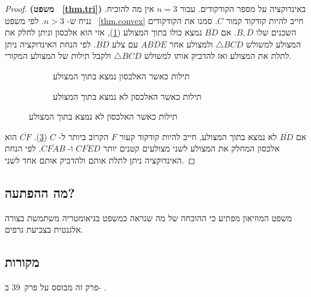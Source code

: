\begin{proof}\textbf{%
(משפט%
~\ref{thm.tri})}
באינדוקציה על מספר הקודקודים. עבור
$n=3$
אין מה להוכיח. נניח ש-%
$n>3$.
לפי משפט%
~\ref{thm.convex}
חייב להיות קודקוד קמור
$C$.
סמנו את הקודקודים השכנים שלו
$B,D$.
אם
$\overline{BD}$
נמצא כולו בתוך המצולע 
(\ref{f.contained}),
אזי הוא אלכסון וניתן לחלק את המצולע למשולש 
$\triangle BCD$
ולמצולע אחר
$\overline{ABDE}$
עם צלע
$\overline{BD}$.
לפי הנחת האינדוקציה ניתן לתלת את המצולע ואז להדביק אותו למשולש
$\triangle BCD$
ולקבל תילות של המצולע המקורי.
\begin{figure}[tb]
\begin{center}
\begin{subfigure}{.4\textwidth}
\caption{תילות כאשר האלכסון נמצא בתוך המצולע}\label{f.contained}
\end{subfigure}
\hspace{3em}
\begin{subfigure}{.4\textwidth}
\caption{תילות כאשר האלכסון לא נמצא בתוך המצולע}\label{f.museum.concave-vertices}
\end{subfigure}
\end{center}
\end{figure}

אם 
$\overline{BD}$
לא נמצא בתוך המצולע, חייב להיות קודקוד קעור
$F$
הקרוב ביותר ל-%
$C$
(\ref{f.museum.concave-vertices}).
$\overline{CF}$
הוא אלכסון המחלק את המצולע לשני מצולעים קטנים יותר
$\overline{CFED}$
ו-%
$\overline{CFAB}$.
לפי הנחת האינדוקציה ניתן לתלת אותם ולהדביק אותם אחד לשני.
\end{proof}


\subsection*{מה ההפתעה?}
משפט המוזיאון מפתיע כי ההוכחה של מה שנראה כמשפט בגיאומטריה משתמשת בצורה אלגנטית בצביעת גרפים.

\subsection*{מקורות}

פרק זה מבוסס על פרק~$39$ ב-%
\cite{thebook}.

